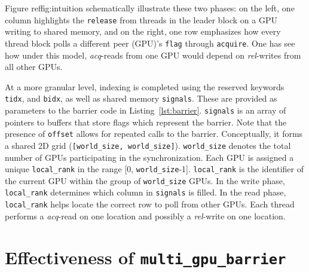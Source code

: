 \documentclass[acmsmall]{acmart}
\begin{document}
Figure ref{fig:intuition} schematically illustrate these two phases: on the left, one column highlights the \texttt{release} from threads in the leader block on a GPU writing to shared memory, and on the right, one row emphasizes how every thread block polls a different peer (GPU)'s \texttt{flag} through \texttt{acquire}. One has see how under this model, \textit{acq}-reads from one GPU would depend on \textit{rel}-writes from all other GPUs.

At a more granular level, indexing is completed using the reserved keywords \texttt{tidx}, and \texttt{bidx}, as well as shared memory \texttt{signals}. These are provided as parameters to the barrier code in Listing~\ref{lst:barrier}. \texttt{signals} is an array of pointers to buffers that store flags which represent the barrier. Note that the presence of \texttt{offset} allows for repeated calls to the barrier. Conceptually, it forms a shared 2D grid (\verb|[world_size, world_size]|). \texttt{world\_size} denotes the total number of GPUs participating in the synchronization. Each GPU is assigned a unique \texttt{local\_rank} in the range [0, \texttt{world\_size}-1]. \texttt{local\_rank} is the identifier of the current GPU within the group of \texttt{world\_size} GPUs. In the write phase, \texttt{local\_rank} determines which column in \texttt{signals} is filled. In the read phase, \texttt{local\_rank} helps locate the correct row to poll from other GPUs. Each thread performs a \textit{acq}-read on one location and possibly a \textit{rel}-write on one location.


\section{Effectiveness of \texttt{multi\_gpu\_barrier}}
\label{sec:proof}
\end{document}

